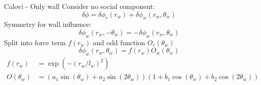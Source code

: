 \documentclass{beamer}
\begin{document}
\begin{frame}{Calovi - Only wall}
Consider no social component:
 \begin{equation*}
  \label{eq:calovi-wall_model}
  \delta \phi = \delta \phi_r (r_w) + \delta \phi_w (r_w, \theta_w)
\end{equation*}
Symmetry for wall influence:
\begin{equation*}
  \label{eq:calovi-wall-symmetry}
   \delta \phi_w (r_w, -\theta_w) =  - \delta \phi_w (r_w, \theta_w)
\end{equation*}
Split into force term $f(r_w)$ and odd function $O_r(\theta_w)$ 
\begin{equation*}
  \label{eq:calovi-wall-split}
  \delta \phi_w (r_w, \theta_w) = f(r_w)O_w(\theta_w)
\end{equation*}
\begin{align*}
  \label{eq:calovi-wall-force}
  f(r_w) &= \exp\left( -{(r_w/l_w)}^2 \right) \\
  O(\theta_w) &= \left(a_1 \sin(\theta_w) + a_2 \sin(2  \theta_w)  \right)  \left(1 +  b_1  \cos(\theta_w) + b_2 \cos(2  \theta_w) \right)
\end{align*}
\end{frame}
\end{document}
